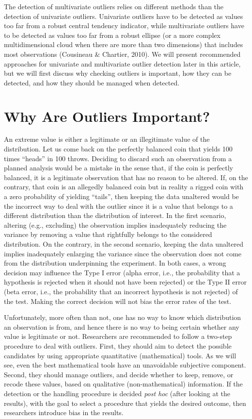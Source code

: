 \documentclass[man,floatsintext]{apa6}
\begin{document}
The detection of multivariate outliers relies on different methods than
the detection of univariate outliers. Univariate outliers have to be
detected as values too far from a robust central tendency indicator,
while multivariate outliers have to be detected as values too far from a
robust ellipse (or a more complex multidimensional cloud when there are
more than two dimensions) that includes most observations (Cousineau \&
Chartier, 2010). We will present recommended approaches for univariate
and multivariate outlier detection later in this article, but we will
first discuss why checking outliers is important, how they can be
detected, and how they should be managed when detected.

\section{Why Are Outliers Important?}\label{why-are-outliers-important}

An extreme value is either a legitimate or an illegitimate value of the
distribution. Let us come back on the perfectly balanced coin that
yields 100 times \enquote{heads} in 100 throws. Deciding to discard such
an observation from a planned analysis would be a mistake in the sense
that, if the coin is perfectly balanced, it is a legitimate observation
that has no reason to be altered. If, on the contrary, that coin is an
allegedly balanced coin but in reality a rigged coin with a zero
probability of yielding \enquote{tails}, then keeping the data unaltered
would be the incorrect way to deal with the outlier since it is a value
that belongs to a different distribution than the distribution of
interest. In the first scenario, altering (e.g., excluding) the
observation implies inadequately reducing the variance by removing a
value that rightfully belongs to the considered distribution. On the
contrary, in the second scenario, keeping the data unaltered implies
inadequately enlarging the variance since the observation does not come
from the distribution underpinning the experiment. In both cases, a
wrong decision may influence the Type I error (alpha error, i.e., the
probability that a hypothesis is rejected when it should not have been
rejected) or the Type II error (beta error, i.e., the probability that
an incorrect hypothesis is not rejected) of the test. Making the correct
decision will not bias the error rates of the test.

Unfortunately, more often than not, one has no way to know which
distribution an observation is from, and hence there is no way to being
certain whether any value is legitimate or not. Researchers are
recommended to follow a two-step procedure to deal with outliers. First,
they should aim to detect the possible candidates by using appropriate
quantitative (mathematical) tools. As we will see, even the best
mathematical tools have an unavoidable subjective component. Second,
they should manage outliers, and decide whether to keep, remove, or
recode these values, based on qualitative (non-mathematical)
information. If the detection or the handling procedure is decided
\emph{post hoc} (after looking at the results), with the goal to select
a procedure that yields the desired outcome, then researchers introduce
bias in the results.
\end{document}

